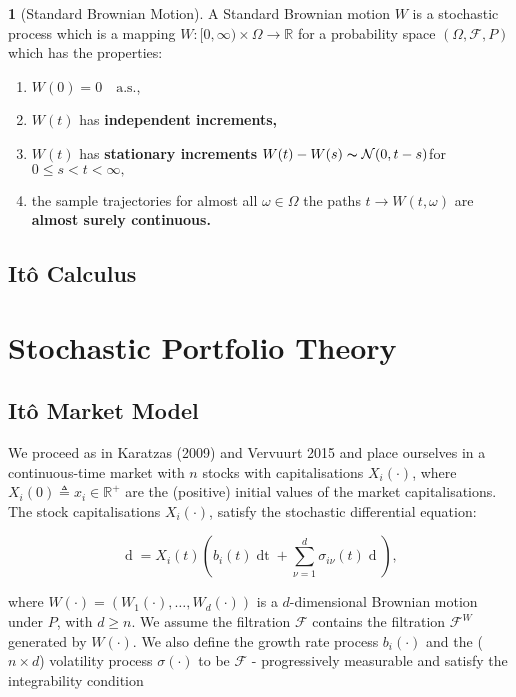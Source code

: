 \documentclass[british]{amsart}
\numberwithin{equation}{section}
\numberwithin{figure}{section}
\theoremstyle{plain}
\theoremstyle{definition}
\newtheorem{defn}[thm]{\protect\definitionname}
\theoremstyle{plain}
\theoremstyle{plain}
\theoremstyle{plain}
\theoremstyle{remark}
\providecommand{\definitionname}{Definition}
\renewcommand{\d}[1]{\mathop{\mathrm{d}{#1}}}
\newcommand{\realnumbers}{\mathbb{R}}
\newcommand{\filtration}[1]{\mathcal{#1}}
\newcommand{\defeq}{\mathop{\triangleq}}
\newcommand{\almostsurely}{\text{a.s.}}
\begin{document}
\begin{defn}[Standard Brownian Motion]
A Standard Brownian motion $W$ is a stochastic process which is a mapping 
$W:[0,\infty)\times\Omega\to\mathbb{R}$ for a probability
space $(\Omega,\mathcal{F},P)$ which has the properties:

\begin{enumerate}
	\item $W(0)=0 \quad \almostsurely$,
	\item $W(t)$ has \textbf{independent increments,}
	\item $W(t)$ has \textbf{stationary increments} 
		$W(t)-W(s)\thicksim\mathcal{N}(0,t-s)$for $0\le s<t<\infty,$
	\item the sample trajectories for almost all $\omega\in\Omega$ the paths 
		$t\to W(t,\omega)$ are \textbf{almost surely continuous.}
\end{enumerate}
\end{defn}

\subsection{It\^{o} Calculus}

\section{Stochastic Portfolio Theory}

\subsection{It\^{o} Market Model}

We proceed as in Karatzas (2009) \cite{karatzas2009} and Vervuurt 2015 
\cite{vervuurt2015} and place ourselves in a continuous-time market with $n$ 
stocks with capitalisations $X_{i}(\cdot)$, where $ X_{i}(0) \defeq 
x_{i} \in \realnumbers^{+} $ are the (positive) initial values of the market 
capitalisations. The stock capitalisations $X_{i}(\cdot)$, satisfy the 
stochastic differential equation:

\begin{equation}
\d{X_{i}(t)} = X_{i}(t) \left( b_{i}(t)\d{t} + \sum_{\nu=1}^{d} 
\sigma_{i\nu}(t){\d{W_{\nu}(t)}} \right), \end{equation}

where $W(\cdot)=(W_{1}(\cdot),\dots,W_{d}(\cdot))$ is a $d$-dimensional Brownian 
motion under $P$, with $d\ge n$. We assume the filtration $\filtration{F}$ 
contains the filtration $\filtration{F}^{W}$ generated by $W(\cdot)$. We also 
define the growth rate process $b_{i}(\cdot)$ and the ($n \times d$) volatility 
process $\sigma(\cdot)$ to be $\filtration{F}$ - progressively measurable and 
satisfy the integrability condition
\end{document}
